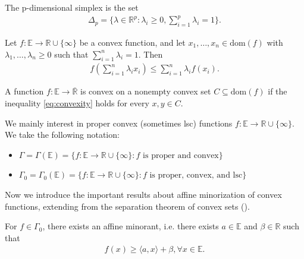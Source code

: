 \documentclass{tufte-handout}
\begin{document}
\begin{Definition}
    The p-dimensional simplex is the set
    \begin{align}
        \Delta_p = \{ \lambda \in \mathbb{R}^p : \lambda_i \ge 0, \sum_{i=1}^p \lambda_i = 1 \}.
    \end{align}
\end{Definition}

\begin{Corollary}
    Let \( f:\mathbb{E}\to \mathbb{R}\cup \{\infty\} \) be a convex function, and let \( x_1, \ldots, x_n \in \text{dom}(f) \) with \( \lambda_1, \ldots, \lambda_n \geq 0 \) such that \( \sum_{i=1}^n \lambda_i = 1 \). Then
    \begin{align}
        f\left(\sum_{i=1}^n \lambda_i x_i\right) \leq \sum_{i=1}^n \lambda_i f(x_i).
    \end{align}
\end{Corollary}

\begin{Definition}
    A function \( f:\mathbb{E}\to \overline{\mathbb{R}} \) is convex on a nonempty convex set 
    \( C \subseteq \text{dom}(f) \)  if 
    the inequality \eqref{eq:convexity} holds for every \( x, y \in C \).
\end{Definition}

We mainly interest in proper convex (sometimes lsc) functions \(f: \mathbb{E}\to \mathbb{R}\cup \{\infty\} \).
We take the following notation:
\begin{itemize}
    \item \( \Gamma = \Gamma(\mathbb{E}) = \{f: \mathbb{E} \to \mathbb{R} \cup \{\infty\} : f \text{ is proper and convex}\}
    \) 
    \item \( \Gamma_0 = \Gamma_0(\mathbb{E}) = \{f: \mathbb{E} \to \mathbb{R} \cup \{\infty\} : f \text{ is proper, convex, and lsc}\}
    \) 
\end{itemize}

Now we introduce the important results about affine minorization of convex functions,
extending from the separation theorem of convex sets ().
\begin{Theorem}
    \label{thm:affine_min}
    For \( f\in \Gamma_0 \), there exists an affine minorant, i.e. there exists
    \( a \in \mathbb{E} \) and \( \beta \in \mathbb{R} \) such that 
    \begin{align}
        f(x) \geq \langle a, x \rangle + \beta, \forall x \in \mathbb{E}.
    \end{align}
\end{Theorem}
\end{document}
